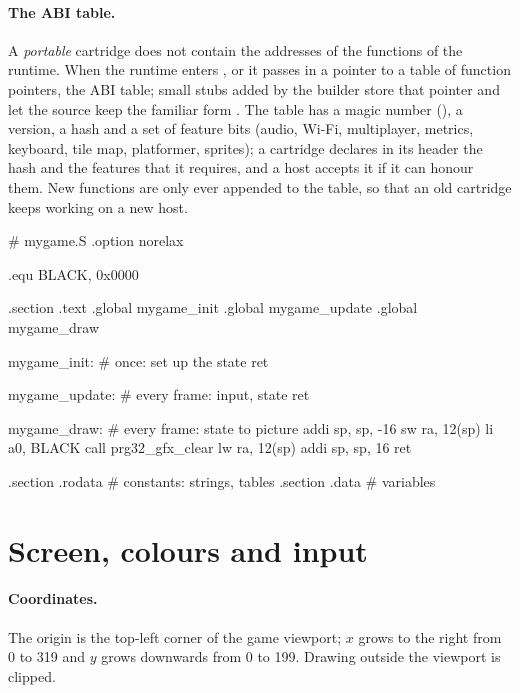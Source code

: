 \paragraph{The ABI table.} A \emph{portable} cartridge does not contain the
addresses of the functions of the runtime. When the runtime enters
,  or  it passes in  a pointer to
a table of function pointers, the ABI table; small stubs added by the builder
store that pointer and let the source keep the familiar form
. The table has a magic number (), a
version, a hash and a set of feature bits (audio, Wi-Fi, multiplayer,
metrics, keyboard, tile map, platformer, sprites); a cartridge declares in
its header the hash and the features that it requires, and a host accepts it
if it can honour them. New functions are only ever appended to the table, so
that an old cartridge keeps working on a new host.

\begin{asm}[caption={The skeleton of a \prg cartridge in assembly.},label=lst:prg:skel]
# mygame.S
.option norelax

.equ BLACK, 0x0000

.section .text
.global mygame_init
.global mygame_update
.global mygame_draw

mygame_init:                # once: set up the state
    ret

mygame_update:              # every frame: input, state
    ret

mygame_draw:                # every frame: state to picture
    addi sp, sp, -16
    sw   ra, 12(sp)
    li   a0, BLACK
    call prg32_gfx_clear
    lw   ra, 12(sp)
    addi sp, sp, 16
    ret

.section .rodata            # constants: strings, tables
.section .data              # variables
\end{asm}

\section{Screen, colours and input}

\paragraph{Coordinates.} The origin is the top-left corner of the game
viewport; $x$ grows to the right from 0 to 319 and $y$ grows downwards from 0
to 199. Drawing outside the viewport is clipped.

